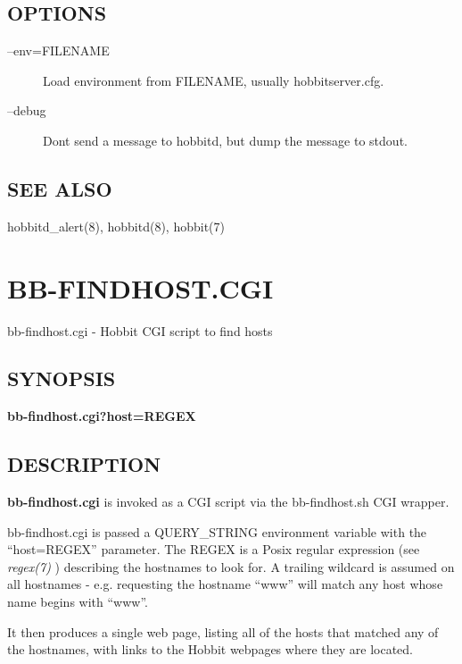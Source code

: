 \subsection{OPTIONS}
\begin{description}
\item[--env=FILENAME] Load environment from FILENAME, usually hobbitserver.cfg. 

 

\item[--debug] Dont send a message to hobbitd, but dump the message to stdout. 

 


\end{description}
\subsection{SEE ALSO}
hobbitd\_alert(8), hobbitd(8), hobbit(7) 

 
%
\newpage
\section{BB-FINDHOST.CGI}

 bb-findhost.cgi - Hobbit CGI script to find hosts

\subsection{SYNOPSIS}
\textbf{bb-findhost.cgi?host=REGEX}


 
\subsection{DESCRIPTION}
\textbf{bb-findhost.cgi}
 is invoked as a CGI script via the bb-findhost.sh CGI wrapper. 

  bb-findhost.cgi is passed a QUERY\_STRING environment variable with
  the ``host=REGEX'' parameter. The REGEX is a Posix regular
  expression (see \emph{regex(7)} ) describing the hostnames to look
  for. A trailing wildcard is assumed on all hostnames -
  e.g. requesting the hostname ``www'' will match any host whose name
  begins with ``www''. 

  It then produces a single web page, listing all of the hosts that
  matched any of the hostnames, with links to the Hobbit webpages
  where they are located. 

